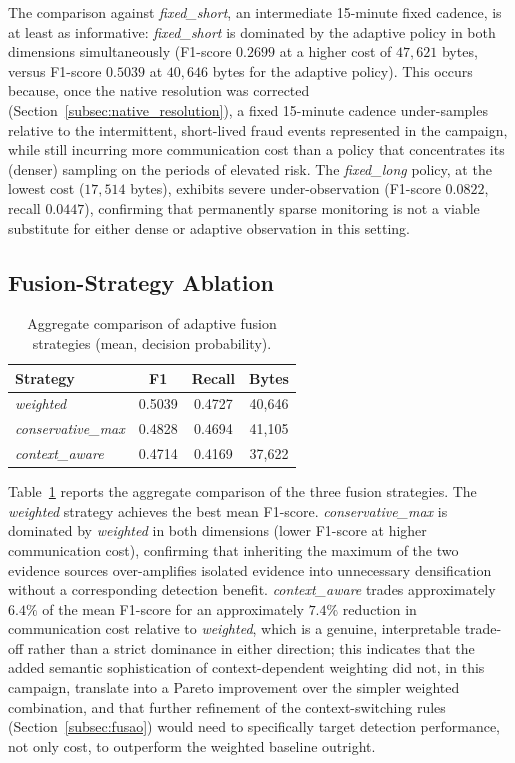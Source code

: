 \documentclass{ieeeaccess}
\begin{document}
The comparison against \textit{fixed\_short}, an intermediate 15-minute fixed cadence, is at least as informative: \textit{fixed\_short} is dominated by the adaptive policy in both dimensions simultaneously (F1-score $0.2699$ at a higher cost of $47{,}621$ bytes, versus F1-score $0.5039$ at $40{,}646$ bytes for the adaptive policy). This occurs because, once the native resolution was corrected (Section~\ref{subsec:native_resolution}), a fixed 15-minute cadence under-samples relative to the intermittent, short-lived fraud events represented in the campaign, while still incurring more communication cost than a policy that concentrates its (denser) sampling on the periods of elevated risk. The \textit{fixed\_long} policy, at the lowest cost ($17{,}514$ bytes), exhibits severe under-observation (F1-score $0.0822$, recall $0.0447$), confirming that permanently sparse monitoring is not a viable substitute for either dense or adaptive observation in this setting.

\subsection{Fusion-Strategy Ablation}
\label{subsec:results_fusion_ablation}
\begin{table}[ht]
\centering
\caption{Aggregate comparison of adaptive fusion strategies (mean, decision probability).}
\label{tab:agg_fusion_results}
\scriptsize
\begin{tabular}{lccc}
\hline
\textbf{Strategy} & \textbf{F1} & \textbf{Recall} & \textbf{Bytes} \\
\hline
\textit{weighted} & 0.5039 & 0.4727 & 40{,}646 \\
\textit{conservative\_max} & 0.4828 & 0.4694 & 41{,}105 \\
\textit{context\_aware} & 0.4714 & 0.4169 & 37{,}622 \\
\hline
\end{tabular}
\end{table}

Table~\ref{tab:agg_fusion_results} reports the aggregate comparison of the three fusion strategies. The \textit{weighted} strategy achieves the best mean F1-score. \textit{conservative\_max} is dominated by \textit{weighted} in both dimensions (lower F1-score at higher communication cost), confirming that inheriting the maximum of the two evidence sources over-amplifies isolated evidence into unnecessary densification without a corresponding detection benefit. \textit{context\_aware} trades approximately $6.4\%$ of the mean F1-score for an approximately $7.4\%$ reduction in communication cost relative to \textit{weighted}, which is a genuine, interpretable trade-off rather than a strict dominance in either direction; this indicates that the added semantic sophistication of context-dependent weighting did not, in this campaign, translate into a Pareto improvement over the simpler weighted combination, and that further refinement of the context-switching rules (Section~\ref{subsec:fusao}) would need to specifically target detection performance, not only cost, to outperform the weighted baseline outright.
\end{document}
